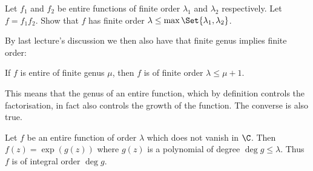 \begin{exercise}
	Let $f_1$ and $f_2$ be entire functions of finite order $\lambda_1$ and $\lambda_2$ respectively.
	Let $f = f_1 f_2$.
	Show that $f$ has finite order $\lambda \leq \max\Set{\lambda_1, \lambda_2}$.
\end{exercise}

By last lecture's discussion we then also have that finite genus implies finite order:

\begin{corollary}\label{cor8.13}
	If $f$ is entire of finite genus $\mu$, then $f$ is of finite order $\lambda \leq \mu + 1$.
\end{corollary}

This means that the genus of an entire function, which by definition controls the factorisation, in fact also controls the growth of the function.
The converse is also true.


\begin{proposition}\label{prop8.14}
	Let $f$ be an entire function of order $\lambda$ which does not vanish in $\C$.
	Then $f(z) = \exp(g(z))$ where $g(z)$ is a polynomial of degree $\deg g \leq \lambda$.
	Thus $f$ is of integral order $\deg g$.
\end{proposition}

